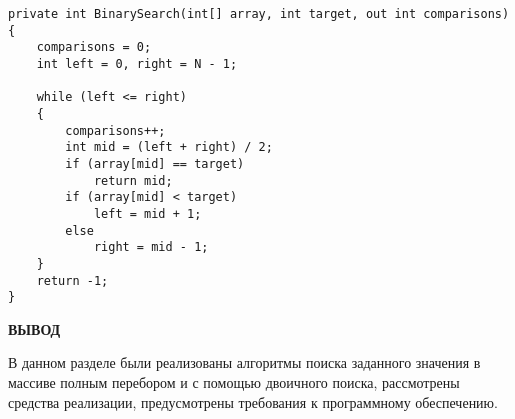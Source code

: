 \begin{center}
\captionsetup{justification=raggedright,singlelinecheck=off}
\begin{lstlisting}[label=lst:binsearch,caption=Алгоритм использующий полный перебор]
private int BinarySearch(int[] array, int target, out int comparisons)
{
    comparisons = 0;
    int left = 0, right = N - 1;

    while (left <= right)
    {
        comparisons++;
        int mid = (left + right) / 2;
        if (array[mid] == target)
            return mid;
        if (array[mid] < target)
            left = mid + 1;
        else
            right = mid - 1;
    }
    return -1;
}
\end{lstlisting}
\end{center}

\clearpage

\vspace{5mm}

\textbf{ВЫВОД}

В данном разделе были реализованы алгоритмы поиска заданного значения в массиве полным перебором и с помощью двоичного поиска, рассмотрены средства реализации, предусмотрены требования к программному обеспечению.

\clearpage